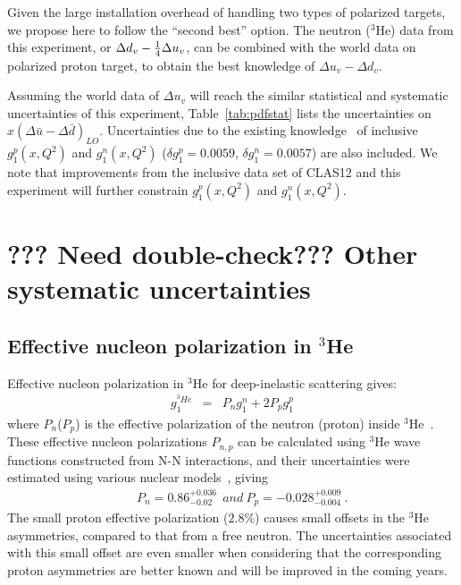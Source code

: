 Given the large installation overhead of handling two types of 
polarized targets, we propose here to follow the ``second best'' option.  
The neutron ($^3$He) data from this experiment, or $\Delta d_v - {1 \over 4} \Delta u_v$,
can be combined with the world data on polarized proton target, 
to obtain the best knowledge of $\Delta u_v - \Delta d_v$.

Assuming the world data of $\Delta u_v$ will reach the similar statistical and systematic uncertainties of this experiment, 
Table~\ref{tab:pdfstat} lists the uncertainties on $x(\Delta \bar{u}-\Delta \bar{d})_{LO}$. Uncertainties due to the existing knowledge~\cite{lit:bbfit,xiaochao} 
of inclusive $g_1^p(x, Q^2)$ and $g_1^n(x, Q^2)$ 
($\delta g_1^p = 0.0059$, $\delta g_1^n=0.0057$) are also
included. We note that improvements from the inclusive data set of CLAS12 and this experiment 
will further constrain $g_1^p(x, Q^2)$ and $g_1^n(x, Q^2)$. 

\section{??? Need double-check??? Other systematic uncertainties}

\subsection{Effective nucleon polarization in $^3$He} \label{ch5:he3model}
Effective nucleon polarization in $^3$He for deep-inelastic scattering gives:
\begin{eqnarray}\label{equ:he3-g1n}
 g_1^{^3 {He}} &=& P_ng_1^n+2P_pg_1^p
\end{eqnarray}
where $P_n$($P_p$) is the effective polarization of the neutron 
(proton) inside $^3$He~\cite{theory:PnPp_friar}.
These effective nucleon polarizations $P_{n,p}$ can be
calculated using $^3$He wave functions constructed from N-N interactions,
and their uncertainties were estimated using various nuclear 
models~\cite{theory:PnPp_nogga,theory:PnPp_friar,theory:3Heconv,theory:PnPp_bissey},
giving 
\begin{eqnarray}
&& P_n=0.86^{+0.036}_{-0.02}~~{and}~P_p=-0.028^{+0.009}_{-0.004}~.\label{equ:PnPp}
\end{eqnarray}
%
The small proton effective polarization ($2.8 \%$) causes small 
offsets in the $^3$He asymmetries, compared to that from a 
free neutron.  The uncertainties associated with this small offset are even smaller
when considering that the corresponding proton asymmetries are better known
 and will be improved in the coming years.


